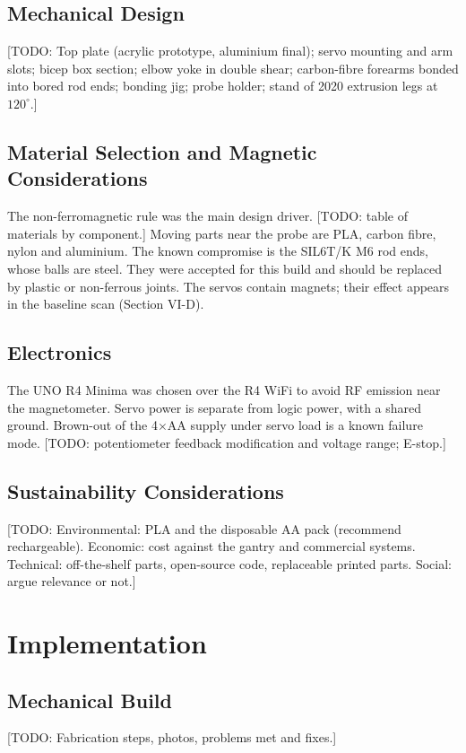 \documentclass[conference]{IEEEtran}
\begin{document}
\subsection{Mechanical Design}
[TODO: Top plate (acrylic prototype, aluminium final); servo mounting and arm slots;
bicep box section; elbow yoke in double shear; carbon-fibre forearms bonded into bored
rod ends; bonding jig; probe holder; stand of 2020 extrusion legs at $120^\circ$.]

\subsection{Material Selection and Magnetic Considerations}
The non-ferromagnetic rule was the main design driver. [TODO: table of materials by
component.] Moving parts near the probe are PLA, carbon fibre, nylon and aluminium.
The known compromise is the SIL6T/K M6 rod ends, whose balls are steel. They were
accepted for this build and should be replaced by plastic or non-ferrous joints.
The servos contain magnets; their effect appears in the baseline scan (Section VI-D).

\subsection{Electronics}
The UNO R4 Minima was chosen over the R4 WiFi to avoid RF emission near the
magnetometer. Servo power is separate from logic power, with a shared ground.
Brown-out of the 4$\times$AA supply under servo load is a known failure mode.
[TODO: potentiometer feedback modification and voltage range; E-stop.]

\subsection{Sustainability Considerations}
[TODO: Environmental: PLA and the disposable AA pack (recommend rechargeable).
Economic: cost against the gantry and commercial systems. Technical: off-the-shelf
parts, open-source code, replaceable printed parts. Social: argue relevance or not.]

\section{Implementation}
\subsection{Mechanical Build}
[TODO: Fabrication steps, photos, problems met and fixes.]
\end{document}
